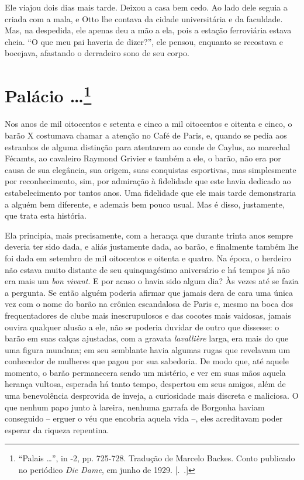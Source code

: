 Ele viajou dois dias mais tarde. Deixou a casa bem cedo. Ao lado dele
seguia a criada com a mala, e Otto lhe contava da cidade universitária e
da faculdade. Mas, na despedida, ele apenas deu a mão a ela, pois a
estação ferroviária estava cheia. ``O que meu pai haveria de dizer?'',
ele pensou, enquanto se recostava e bocejava, afastando o derradeiro
sono de seu corpo.

\chapter{Palácio \ldots{}\footnote[*]{``Palais \ldots{}'', in  -2, pp.
  725-728. Tradução de Marcelo Backes. Conto publicado no periódico
  \emph{Die Dame}, em junho de 1929. [.~.]} }

Nos anos de mil oitocentos e setenta e cinco a mil oitocentos e oitenta
e cinco, o barão X costumava chamar a atenção no Café de Paris, e,
quando se pedia aos estranhos de alguma distinção para atentarem ao
conde de Caylus, ao marechal Fécamts, ao cavaleiro Raymond Grivier e
também a ele, o barão, não era por causa de sua elegância, sua origem,
suas conquistas esportivas, mas simplesmente por reconhecimento, sim,
por admiração à fidelidade que este havia dedicado ao estabelecimento
por tantos anos. Uma fidelidade que ele mais tarde demonstraria a alguém
bem diferente, e ademais bem pouco usual. Mas é disso, justamente, que
trata esta história.

Ela principia, mais precisamente, com a herança que durante trinta anos
sempre deveria ter sido dada, e aliás justamente dada, ao barão, e
finalmente também lhe foi dada em setembro de mil oitocentos e oitenta e
quatro. Na época, o herdeiro não estava muito distante de seu
quinquagésimo aniversário e há tempos já não era mais um \emph{bon}
\emph{vivant}. E por acaso o havia sido algum dia? Às vezes até se fazia
a pergunta. Se então alguém poderia afirmar que jamais dera de cara uma
única vez com o nome do barão na crônica escandalosa de Paris e, mesmo
na boca dos frequentadores de clube mais inescrupulosos e das cocotes
mais vaidosas, jamais ouvira qualquer alusão a ele, não se poderia
duvidar de outro que dissesse: o barão em suas calças ajustadas, com a
gravata \emph{lavallière} larga, era mais do que uma figura mundana; em
seu semblante havia algumas rugas que revelavam um conhecedor de
mulheres que pagou por sua sabedoria. De modo que, até aquele momento, o
barão permanecera sendo um mistério, e ver em suas mãos aquela herança
vultosa, esperada há tanto tempo, despertou em seus amigos, além de uma
benevolência desprovida de inveja, a curiosidade mais discreta e
maliciosa. O que nenhum papo junto à lareira, nenhuma garrafa de
Borgonha haviam conseguido -- erguer o véu que encobria aquela vida --,
eles acreditavam poder esperar da riqueza repentina.


